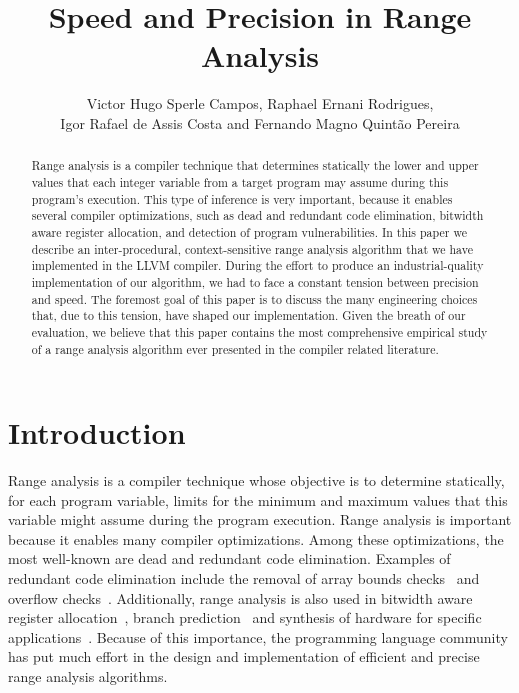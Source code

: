 \documentclass{llncs}
\begin{document}
\title{Speed and Precision in Range Analysis}

\author{Victor Hugo Sperle Campos, Raphael Ernani Rodrigues, \\
Igor Rafael de Assis Costa and Fernando Magno Quint\~{a}o Pereira}



\maketitle

\begin{abstract}
Range analysis is a compiler technique that determines statically the lower and
upper values that each integer variable from a target program may assume
during this program's execution.
This type of inference is very important, because it enables several compiler
optimizations, such as dead and redundant code elimination, bitwidth aware
register allocation, and detection of program vulnerabilities.
In this paper we describe an inter-procedural, context-sensitive range analysis
algorithm that we have implemented in the LLVM compiler.
During the effort to produce an industrial-quality implementation of our
algorithm, we had to face a constant tension between precision and speed.
The foremost goal of this paper is to discuss the many engineering choices
that, due to this tension, have shaped our implementation.
Given the breath of our evaluation, we believe that this paper
contains the most comprehensive empirical study of a range analysis
algorithm ever presented in the compiler related literature.
\end{abstract}

\section{Introduction}
\label{sec:int}

Range analysis is a compiler technique whose objective is to determine
statically, for each program variable, limits for the minimum and maximum
values that this variable might assume during the program execution.
Range analysis is important because it enables many compiler optimizations.
Among these optimizations, the most well-known are dead and redundant
code elimination.
Examples of redundant code elimination include the removal of array bounds
checks~\cite{Bodik00,Logozzo08,Venet04} and overflow checks~\cite{Sol11}.
Additionally, range analysis is also used in bitwidth aware register
allocation~\cite{Barik06,Pereira08,Tallam03}, branch
prediction~\cite{Patterson95} and synthesis of hardware for specific
applications~\cite{Cong05,Lhairech10,Mahlke01,Stephenson00}.
Because of this importance, the programming language community has put much
effort in the design and implementation of efficient and precise range
analysis algorithms.
\end{document}
